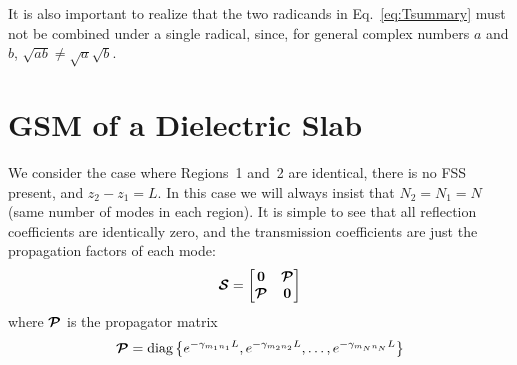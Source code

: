 It is also important to realize that the two radicands in
Eq.~\eqref{eq:Tsummary} must not be combined under a single radical,
since, for general complex numbers $a$ and $b$, $\sqrt{ab} \neq
\sqrt{a}\sqrt{b}$. 

\section{GSM of a Dielectric Slab}
We consider the case where Regions~1 and~2 are identical, there is no
FSS present, and $z_2 - z_1 = L$.  In this case we will always insist
that $N_2 = N_1 = N$ (same number of modes in each region). It is simple
to see that all reflection
coefficients are identically zero, and the transmission coefficients
are just the propagation factors of each mode:
\begin{equation}
  \boldsymbol{\mathcal{S}} = 
  \begin{bmatrix}
    \boldsymbol{0} & \boldsymbol{\mathcal{P}} \\
    \boldsymbol{\mathcal{P}} & \boldsymbol{0}
  \end{bmatrix}
\end{equation}
where $\boldsymbol{\mathcal{P}}$ is the {propagator matrix} \cite{micc:88}
\begin{equation}
  \label{eq:Pdef}
  \boldsymbol{\mathcal{P}} = \text{diag}\left\{e^{-\gamma_{m_1 n_1}L},
    e^{-\gamma_{m_2 n_2}L},\ldots,
    e^{-\gamma_{m_N n_N}L}\right\}
\end{equation}
